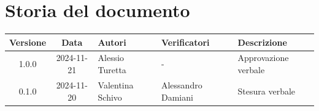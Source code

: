 \section*{Storia del documento}
\begin{tabularx}{\textwidth}{ c c p{2.75cm} p{2.75cm} X }
    \rowcolor{gray!20}\rule{0pt}{0.5cm}\textbf{Versione} & \textbf{Data} & \textbf{Autori} & \textbf{Verificatori} & \textbf{Descrizione} \\[0.7ex]
    \hline
    \rule{0pt}{0.5cm}1.0.0 & 2024-11-21 & Alessio Turetta & - & Approvazione verbale\\[0.7ex]
    \hline
    \rule{0pt}{0.5cm}0.1.0 & 2024-11-20 & Valentina Schivo & Alessandro Damiani & Stesura verbale\\[0.7ex]
\end{tabularx}